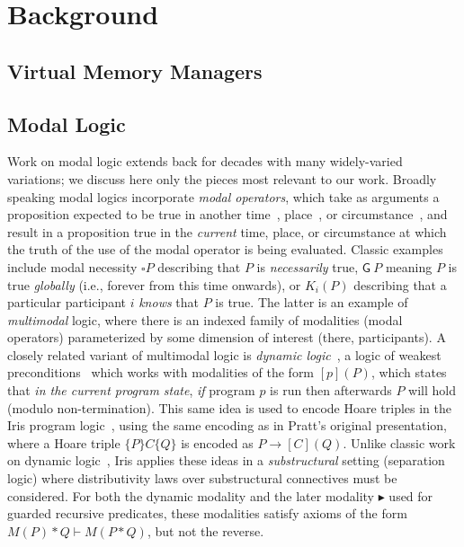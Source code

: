 \section{Background}
\label{sec:background}
\subsection{Virtual Memory Managers}
\label{sec:backgroundonvmm}
\subsection{Modal Logic}
\label{sec:backgroundonmodallogic}
Work on modal logic extends back for decades with many widely-varied variations; we discuss here only the pieces most relevant to our work.
Broadly speaking modal logics incorporate \emph{modal operators}, which take as arguments a proposition expected to be true in another time~\cite{pnueli1977temporal}, place~\cite{gordon2019modal,goranko1996hierarchies,areces2001hybrid,gargov1993modal}, or circumstance~\cite{hintikka1962knowledge,halpern1985guide}, and result in a proposition true in the \emph{current} time, place, or circumstance at which the truth of the use of the modal operator is being evaluated. Classic examples include modal necessity $\square P$ describing that $P$ is \emph{necessarily} true, $\mathsf{G}~P$ meaning $P$ is true \emph{globally} (i.e., forever from this time onwards), or $K_i(P)$ describing that a particular participant $i$ \emph{knows} that $P$ is true. The latter is an example of \emph{multimodal} logic, where there is an indexed family of modalities (modal operators) parameterized by some dimension of interest (there, participants).
A closely related variant of multimodal logic is \emph{dynamic logic}~\cite{pratt1976semantical}, a logic of weakest preconditions~\cite{dijkstra-75} which works with modalities of the form $[p](P)$, which states that \emph{in the current program state}, \emph{if} program $p$ is run then afterwards $P$ will hold (modulo non-termination).
This same idea is used to encode Hoare triples in the Iris program logic~\cite{krebbers2017essence}, using the same encoding as in Pratt's original presentation, where a Hoare triple $\{P\}C\{Q\}$ is encoded as $P\rightarrow[C](Q)$. Unlike classic work on dynamic logic~\cite{harel2000dynamic}, Iris applies these ideas in a \emph{substructural} setting (separation logic) where distributivity laws over substructural connectives must be considered. For both the dynamic modality and the later modality $\blacktriangleright$ used for guarded recursive predicates, these modalities satisfy axioms of the form $M(P)\ast Q\vdash M(P\ast Q)$, but not the reverse.
